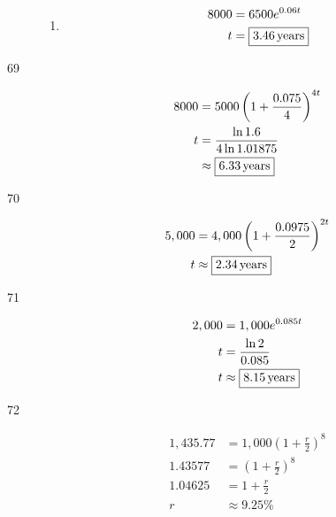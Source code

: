 \documentclass{exam}
\begin{document}
\begin{description}
\begin{enumerate}[a]
          \item
            \begin{align*}
              8000 &= 6500 e^{0.06 t} \\
              t     &= \boxed{\unit[3.46]{years}} \\
            \end{align*}
        \end{enumerate}

      \item[69]
        \begin{align*}
          8000    &= 5000 \left( 1 + \frac{0.075}{4} \right)^{4t} \\
          t       &= \frac{\ln 1.6}{4 \ln 1.01875} \\
                  &\approx \boxed{\unit[6.33]{years}} \\
        \end{align*}

      \item[70]
        \begin{align*}
          5,000 & = 4,000 \left( 1 + \frac{0.0975}{2} \right)^{2t} \\
          t     & \approx \boxed{\unit[2.34]{years}} \\
        \end{align*}

      \item[71]
        \begin{align*}
          2,000 & = 1,000 e^{0.085t} \\
          t     & = \frac{\ln 2}{0.085} \\
          t     & \approx \boxed{\unit[8.15]{years}} \\
        \end{align*}

      \item[72]
        \begin{align*}
          1,435.77 & = 1,000 \left( 1 + \frac{r}{2} \right)^8 \\
          1.43577  & = \left( 1 + \frac{r}{2} \right)^8 \\
          1.04625  & = 1 + \frac{r}{2} \\
          r        & \approx \boxed{9.25\%} \\
        \end{align*}


\end{description}
\end{document}
